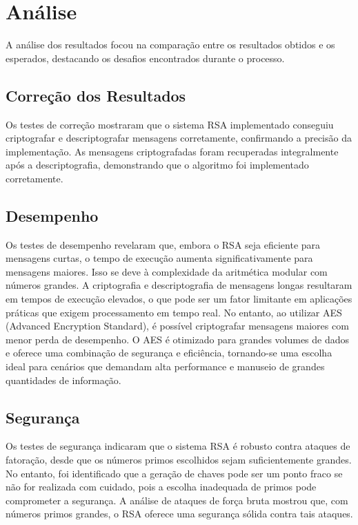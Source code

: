 \documentclass[a4paper,12pt]{article}
\begin{document}
\section*{Análise}
A análise dos resultados focou na comparação entre os resultados obtidos e os esperados, destacando os desafios encontrados durante o processo.

\subsection*{Correção dos Resultados}
Os testes de correção mostraram que o sistema RSA implementado conseguiu criptografar e descriptografar mensagens corretamente, confirmando a precisão da implementação. As mensagens criptografadas foram recuperadas integralmente após a descriptografia, demonstrando que o algoritmo foi implementado corretamente.

\subsection*{Desempenho}
Os testes de desempenho revelaram que, embora o RSA seja eficiente para mensagens curtas, o tempo de execução aumenta significativamente para mensagens maiores. Isso se deve à complexidade da aritmética modular com números grandes. A criptografia e descriptografia de mensagens longas resultaram em tempos de execução elevados, o que pode ser um fator limitante em aplicações práticas que exigem processamento em tempo real. No entanto, ao utilizar AES (Advanced Encryption Standard), é possível criptografar mensagens maiores com menor perda de desempenho. O AES é otimizado para grandes volumes de dados e oferece uma combinação de segurança e eficiência, tornando-se uma escolha ideal para cenários que demandam alta performance e manuseio de grandes quantidades de informação.

\subsection*{Segurança}
Os testes de segurança indicaram que o sistema RSA é robusto contra ataques de fatoração, desde que os números primos escolhidos sejam suficientemente grandes. No entanto, foi identificado que a geração de chaves pode ser um ponto fraco se não for realizada com cuidado, pois a escolha inadequada de primos pode comprometer a segurança. A análise de ataques de força bruta mostrou que, com números primos grandes, o RSA oferece uma segurança sólida contra tais ataques.
\end{document}

